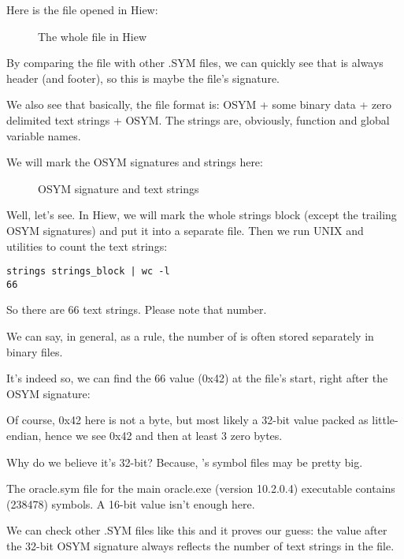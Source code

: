 \clearpage
Here is the file opened in Hiew:

\begin{figure}[H]
\centering
{}
\caption{The whole file in Hiew}
\label{fig:oracle_SYM_whole1}
\end{figure}

By comparing the file with other .SYM files, we can quickly see that  is always header (and footer),
so this is maybe the file's signature.

We also see that basically, the file format is: OSYM + some binary data + zero delimited text strings + OSYM.
The strings are, obviously, function and global variable names.

\clearpage
We will mark the OSYM signatures and strings here: 

\begin{figure}[H]
\centering
{}
\caption{OSYM signature and text strings}
\label{fig:oracle_SYM_whole2}
\end{figure}

Well, let's see. 
In Hiew, we will mark the whole strings block (except the trailing OSYM signatures) and put it into a separate file.
Then we run UNIX  and  utilities to count the text strings:

\begin{lstlisting}
strings strings_block | wc -l
66
\end{lstlisting}

So there are 66 text strings.
Please note that number.

We can say, in general, as a rule, the number of  is often stored separately in binary files.

It's indeed so, we can find the 66 value (0x42) at the file's start, right after the OSYM signature:



Of course, 0x42 here is not a byte, but most likely a 32-bit value packed as little-endian, hence we see
0x42 and then at least 3 zero bytes.

Why do we believe it's 32-bit?
Because, \oracle's symbol 
files may be pretty big.

The oracle.sym file for the main oracle.exe (version 10.2.0.4) executable contains  (238478) symbols.
A 16-bit value isn't enough here.

We can check other .SYM files like this and it proves our guess: the value after the 32-bit OSYM signature always
reflects the number of text strings in the file.

